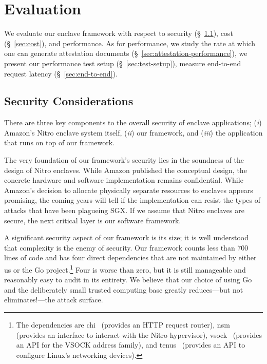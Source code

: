 \section{Evaluation}
\label{sec:evaluation}

We evaluate our enclave framework with respect to security
(\S~\ref{sec:security}), cost (\S~\ref{sec:cost}), and performance.  As for
performance, we study the rate at which one can generate attestation documents
(\S~\ref{sec:attestation-performance}), we present our performance test setup
(\S~\ref{sec:test-setup}), measure end-to-end request latency
(\S~\ref{sec:end-to-end}).

\subsection{Security Considerations}
\label{sec:security}

There are three key components to the overall security of enclave applications;
(\emph{i}) Amazon's Nitro enclave system itself, (\emph{ii}) our framework, and
(\emph{iii}) the application that runs on top of our framework.

The very foundation of our framework's security lies in the soundness of the
design of Nitro enclaves.  While Amazon published the conceptual design, the
concrete hardware and software implementation remains confidential.  While
Amazon's decision to allocate physically separate resources to enclaves appears
promising, the coming years will tell if the implementation can resist the types
of attacks that have been plagueing SGX.  If we assume that Nitro enclaves are
secure, the next critical layer is our software framework.

A significant security aspect of our framework is its size; it is well
understood that complexity is the enemy of security.  Our framework counts less
than 700 lines of code and has four direct dependencies that are not maintained
by either us or the Go project.\footnote{The dependencies are chi~\cite{chi}
(provides an HTTP request router), nsm~\cite{nsm} (provides an interface to
interact with the Nitro hypervisor), vsock~\cite{vsock} (provides an API for the
VSOCK address family), and tenus~\cite{tenus} (provides an API to configure
Linux's networking devices).} Four is worse than zero, but it is still
manageable and reasonably easy to audit in its entirety.  We believe that our
choice of using Go and the deliberately small trusted computing base greatly
reduces---but not eliminates!---the attack surface.

